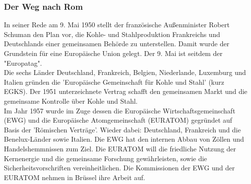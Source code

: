 \documentclass[letterpaper, 12pt]{article}
\let\tempsubsubsection\subsubsection
\renewcommand\subsubsection[1]{\vspace{0cm}\tempsubsubsection{#1}\vspace{0cm}}
\begin{document}
\subsubsection{Der Weg nach Rom}

In seiner Rede am 9. Mai 1950 stellt der französische Außenminister Robert Schuman den Plan vor, die Kohle- und Stahlproduktion Frankreichs und Deutschlands einer gemeinsamen Behörde zu unterstellen. Damit wurde der Grundstein für eine Europäische Union gelegt. Der 9. Mai ist seitdem der "Europatag". \\
Die sechs Länder Deutschland, Frankreich, Belgien, Niederlande, Luxemburg und Italien gründen die 'Europäische Gemeinschaft für Kohle und Stahl' (kurz EGKS). Der 1951 unterzeichnete Vertrag schafft den gemeinsamen Markt und die gemeinsame Kontrolle über Kohle und Stahl. \\
Im Jahr 1957 wurde im Zuge dessen die Europäische Wirtschaftsgemeinschaft (EWG) und die Europäische Atomgemeinschaft (EURATOM) gegründet auf Basis der 'Römischen Verträge'. Wieder dabei: Deutschland, Frankreich und die Benelux-Länder sowie Italien. Die EWG hat den internen Abbau von Zöllen und Handelshemmnissen zum Ziel. Die EURATOM will die friedliche Nutzung der Kernenergie und die gemeinsame Forschung gewährleisten, sowie die Sicherheitsvorschriften vereinheitlichen. Die Kommissionen der EWG und der EURATOM nehmen in Brüssel ihre Arbeit auf.

\clearpage


\end{document}
